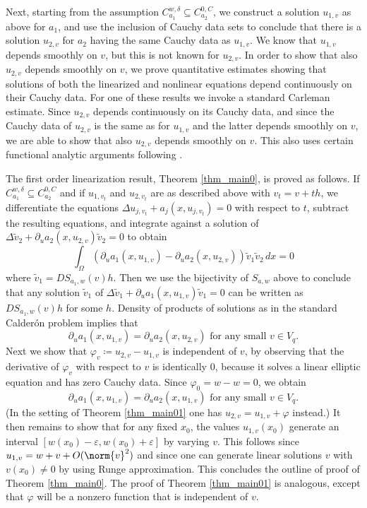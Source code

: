 \documentclass[11pt,a4paper]{amsart}
\theoremstyle{definition}
\numberwithin{equation}{section}
\newcommand{\eps}{\varepsilon}
\newcommand{\p}{\partial}
\newcommand{\Om}{\Omega}
\begin{document}
Next, starting from the assumption $C_{a_1}^{w,\delta} \subseteq C_{a_2}^{0,C}$, we construct a solution $u_{1,v}$ as above for $a_1$, and use the inclusion of Cauchy data sets to conclude that there is a solution $u_{2,v}$ for $a_2$ having the same Cauchy data as $u_{1,v}$. We know that $u_{1,v}$ depends smoothly on $v$, but this is not known for $u_{2,v}$. In order to show that also $u_{2,v}$ depends smoothly on $v$, we prove quantitative estimates showing that solutions of both the linearized and nonlinear equations depend continuously on their Cauchy data. For one of these results we invoke a standard Carleman estimate. Since $u_{2,v}$ depends continuously on its Cauchy data, and since the Cauchy data of $u_{2,v}$ is the same as for $u_{1,v}$ and the latter depends smoothly on $v$, we are able to show that also $u_{2,v}$ depends smoothly on $v$. This also uses certain functional analytic arguments following \cite{OSSU}.

The first order linearization result, Theorem \ref{thm_main0}, is proved as follows. If $C_{a_1}^{w,\delta} \subseteq C_{a_2}^{0,C}$ and if $u_{1,v_t}$ and $u_{2,v_t}$ are as described above with $v_t = v+th$, we differentiate the equations $\Delta u_{j,v_t} + a_j(x,u_{j,v_t})=0$ with respect to $t$, subtract the resulting equations, and integrate against a solution of $\Delta \tilde{v}_2 + \p_u a_2(x,u_{2,v}) \tilde{v}_2 = 0$ to obtain 
\[
\int_{\Om} (\p_u a_1(x,u_{1,v}) - \p_u a_2(x,u_{2,v})) \tilde{v}_1 \tilde{v}_2 \,dx = 0
\]
where $\tilde{v}_1 = DS_{a_1,w}(v)h$. Then we use the bijectivity of $S_{a,w}$ above to conclude that any solution $\tilde{v}_1$ of $\Delta \tilde{v}_1 + \p_u a_1(x,u_{1,v}) \tilde{v}_1 = 0$ can be written as $DS_{a_1,w}(v)h$ for some $h$. Density of products of solutions as in the standard Calder\'on problem \cites{SylvesterUhlmann, Bukhgeim, btw20} implies that 
\[
\p_u a_1(x,u_{1,v}) = \p_u a_2(x,u_{2,v}) \text{ for any small $v \in V_q$.}
\]
Next we show that $\varphi_v \coloneqq u_{2,v}-u_{1,v}$ is independent of $v$, by observing that the derivative of $\varphi_v$ with respect to $v$ is identically $0$, because it solves a linear elliptic equation and has zero Cauchy data. Since $\varphi_0 = w-w = 0$, we obtain 
\[
\p_u a_1(x,u_{1,v}) = \p_u a_2(x,u_{1,v}) \text{ for any small $v \in V_q$.}
\]
(In the setting of Theorem \ref{thm_main01} one has $u_{2,v} = u_{1,v} + \varphi$ instead.) It then remains to show that for any fixed $x_0$, the values $u_{1,v}(x_0)$ generate an interval $[w(x_0)-\eps, w(x_0)+\eps]$ by varying $v$. This follows since $u_{1,v} = w + v + O(\norm{v}^2)$ and since one can generate linear solutions $v$ with $v(x_0) \neq 0$ by using Runge approximation. This concludes the outline of proof of Theorem \ref{thm_main0}. The proof of Theorem \ref{thm_main01} is analogous, except that $\varphi$ will be a nonzero function that is independent of $v$.
\end{document}
